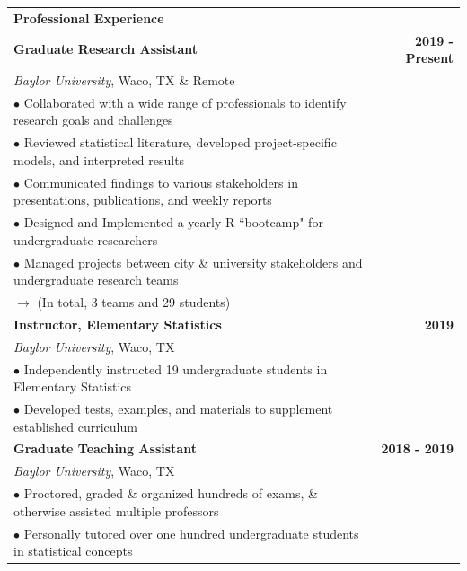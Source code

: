 \documentclass[10pt, hidelinks]{article}
\begin{document}
\noindent
\begin{tabular}{p{15.5cm}r}
\Large{\textbf{Professional Experience}} & \vspace{3px}\\

\textbf{Graduate Research Assistant} & \textbf{2019 - Present} \\
\textit{Baylor University}, Waco, TX \& Remote & \\
\hspace{10px} $\bullet$ Collaborated with a wide range of professionals to identify research goals and challenges \\
\hspace{10px} $\bullet$ Reviewed statistical literature, developed project-specific models, and interpreted results \\
\hspace{10px} $\bullet$ Communicated findings to various stakeholders in presentations, publications, and weekly reports \\
\hspace{10px} $\bullet$ Designed and Implemented a yearly R ``bootcamp" for undergraduate researchers & \\
\hspace{10px} $\bullet$ Managed projects between city \& university stakeholders and undergraduate research teams & \\
\hspace{20px} $\rightarrow$ (In total, 3 teams and 29 students) &  \vspace{1px} \\

\textbf{Instructor, Elementary Statistics} & \textbf{2019} \\
\textit{Baylor University}, Waco, TX & \\
\hspace{10px} $\bullet$ Independently instructed 19 undergraduate students in Elementary Statistics & \\
\hspace{10px} $\bullet$ Developed tests, examples, and materials to supplement established curriculum & \vspace{1px} \\

\textbf{Graduate Teaching Assistant} & \textbf{2018 - 2019} \\
\textit{Baylor University}, Waco, TX & \\
\hspace{10px} $\bullet$ Proctored, graded \& organized hundreds of exams, \& otherwise assisted multiple professors & \\
\hspace{10px} $\bullet$ Personally tutored over one hundred undergraduate students in statistical concepts & \vspace{1px}\\



\end{tabular}
\end{document}

